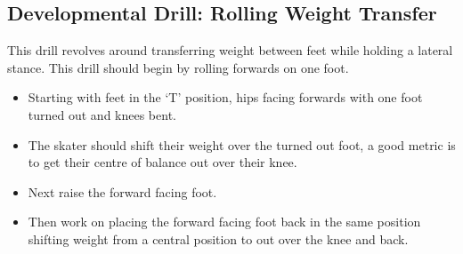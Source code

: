 \subsection*{Developmental Drill: Rolling Weight Transfer}
\label{drill:lateral/book/weight_transfer_rolling}

This drill revolves around transferring weight between feet while holding a lateral stance. 
This drill should begin by rolling forwards on one foot.  

\begin{itemize}
\item Starting with feet in the `T' position, hips facing forwards with one foot turned out and knees bent.
\item The skater should shift their weight over the turned out foot, a good metric is to get their centre of balance out over their knee. 
\item Next raise the forward facing foot. 
\item Then work on placing the forward facing foot back in the same position shifting weight from a central position to out over the knee and back.
\end{itemize}


